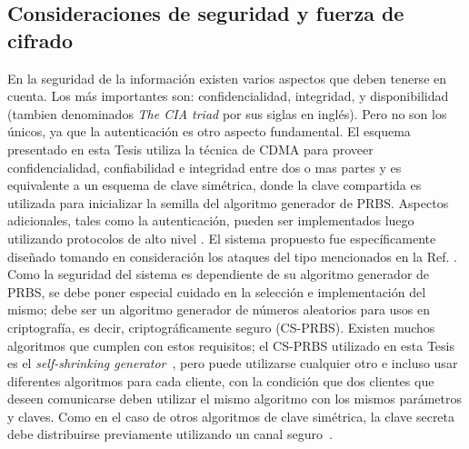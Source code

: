 \subsection{Consideraciones de seguridad y fuerza de cifrado}\label{Seguridad-fuerza}
En la seguridad de la información existen varios aspectos que deben tenerse en cuenta. Los más importantes son: confidencialidad, integridad, y disponibilidad (tambien denominados \textit{The CIA triad} \cite{greene2006security} por sus siglas en inglés). Pero no son los únicos, ya que la autenticación es otro aspecto fundamental.
El esquema presentado en esta Tesis utiliza la técnica de CDMA para proveer confidencialidad, confiabilidad e integridad entre dos o mas partes y es equivalente a un esquema de clave simétrica, donde la clave compartida es utilizada para inicializar la semilla del algoritmo generador de PRBS. Aspectos adicionales, tales como la autenticación, pueden ser implementados luego utilizando protocolos de alto nivel \cite{krawczyk2001order}.
El sistema propuesto fue específicamente diseñado tomando en consideración los ataques del tipo mencionados en la Ref. \cite{Shake:05}.
Como la seguridad del sistema es dependiente de su algoritmo generador de PRBS, se debe poner especial cuidado en la selección e implementación del mismo; debe ser un algoritmo generador de números aleatorios para usos en criptografía, es decir, criptográficamente seguro (CS-PRBS). Existen muchos algoritmos que cumplen con estos requisitos; el CS-PRBS utilizado en esta Tesis es el \textit{self-shrinking generator}~\cite{Meier:94}, pero puede utilizarse cualquier otro e incluso usar diferentes algoritmos para cada cliente, con la condición que dos clientes que deseen comunicarse deben utilizar el mismo algoritmo con los mismos parámetros y claves.
Como en el caso de otros algoritmos de clave simétrica, la clave secreta debe distribuirse previamente utilizando un canal seguro~\cite{Menezes:1996:HAC:548089}.

